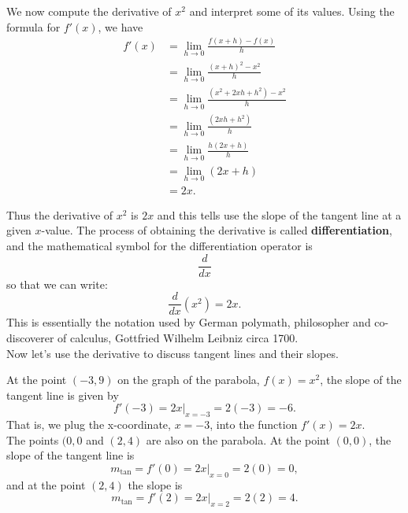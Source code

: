 \documentclass{ximera}
\begin{document}
\begin{example}[example 1]
We now compute the derivative of $x^2$ and interpret some of its values.
Using the formula for $f'(x)$, we have
\begin{align*}
f'(x) &= \lim_{h \to 0} \frac{f(x+h)-f(x)}{h}\\[5pt] 
&= \lim_{h \to 0} \frac{(x+h)^2- x^2}{h}\\[5pt] 
&= \lim_{h \to 0} \frac{(x^2 + 2xh + h^2)- x^2}{h} \\[5pt] 
&=  \lim_{h \to 0} \frac{ (2xh + h^2)}{h}\\[5pt] 
&=  \lim_{h \to 0} \frac{ h(2x + h)}{h}\\[5pt] 
&=  \lim_{h \to 0} (2x + h)\\
&= 2x.
\end{align*}

Thus the derivative of $x^2$ is $2x$ and this tells use the slope of the tangent line at a given $x$-value.
The process of obtaining the derivative is called \textbf{differentiation},
and the mathematical symbol for the differentiation operator is
\[
\frac{d}{dx}
\]
so that we can write:
\[
\frac{d}{dx}\left( x^2\right) = 2x.
\]
This is essentially the notation used by German polymath, philosopher and co-discoverer of calculus, 
Gottfried Wilhelm Leibniz circa 1700.\\
Now let's use the derivative to discuss tangent lines and their slopes.

At the point $(-3, 9)$ on the graph of the parabola, $f(x) = x^2$, the slope of the tangent line is given by 
\[
f'(-3) = 2x\big|_{x=-3} = 2(-3) = -6.
\]
That is, we plug the x-coordinate, $x=-3$, into the function $f'(x) = 2x$.\\
The points $(0,0$ and $(2,4)$ are also on the parabola. 
At the point $(0,0)$, the slope of the tangent line is 
\[
m_{\text{tan}}= f'(0) =2x\big|_{x=0}= 2(0) = 0,
\]
 and at the point $(2, 4)$ the slope is 
\[
m_{\text{tan}}= f'(2) =2x\big|_{x=2}= 2(2) = 4.
\]




\end{example}
\end{document}
